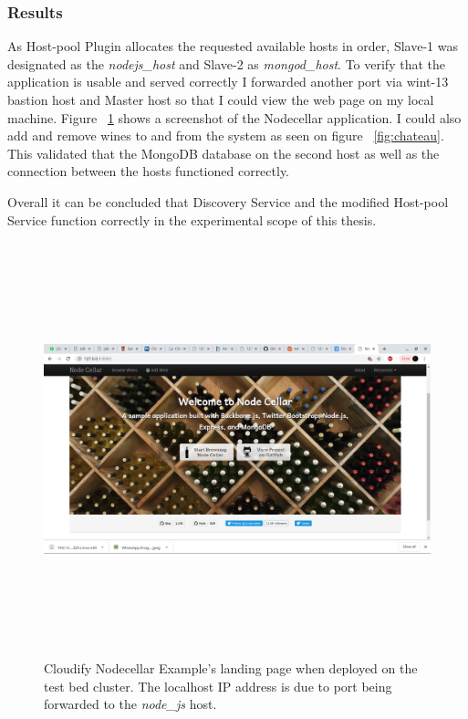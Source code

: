 \subsubsection*{Results}

As Host-pool Plugin allocates the requested available hosts in order, Slave-1 was designated as the \textit{nodejs\_host} and Slave-2 as \textit{mongod\_host}. To verify that the application is usable and served correctly I forwarded another port via wint-13 bastion host and Master host so that I could  view the web page on my local machine. Figure ~\ref{fig:nodecellar} shows a screenshot of the Nodecellar application. I could also add and remove wines to and from the system as seen on figure ~\ref{fig:chateau}. This validated that the MongoDB database on the second host as well as the connection between the hosts functioned correctly.

Overall it can be concluded that Discovery Service and the modified Host-pool Service function correctly in the experimental scope of this thesis.

 \begin{figure}[ht!]
\centering
  \includegraphics[width=12cm,height=12cm, keepaspectratio]{Nodecellarscreenshot.png}%
  \caption{Cloudify Nodecellar Example's landing page when deployed on the test bed cluster. The localhost IP address is due to port being forwarded to the \textit{node\_js} host.}
  \label{fig:nodecellar}
\end{figure}


